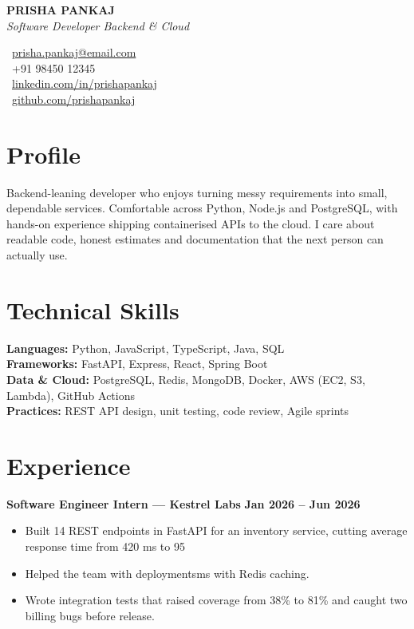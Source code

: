 \documentclass[a4paper,10pt]{article}
\newcommand{\resumeItemListStart}{\begin{itemize}[leftmargin=1.15em, itemsep=3pt, topsep=3pt, partopsep=0pt, parsep=0pt]}
\newcommand{\resumeItemListEnd}{\end{itemize}\vspace{5pt}}
\newcommand{\resumeEntryTitle}[2]{\textbf{#1} \hfill \textbf{#2} \\[-9pt]}
\begin{document}
\noindent
\begin{minipage}[t]{0.60\textwidth}
  \raggedright
  {\fontsize{24}{26}\selectfont \bfseries PRISHA PANKAJ} \\[3pt]
  \textit{Software Developer \textbar{} Backend \& Cloud}
\end{minipage}%
\begin{minipage}[t]{0.40\textwidth}
  \raggedleft
  \vspace{-17pt}
  \small
  \faEnvelope \ \href{mailto:prisha.pankaj@email.com}{prisha.pankaj@email.com} \\[3pt]
  \faPhone \ +91 98450 12345 \\[3pt]
  \faLinkedin \ \href{https://linkedin.com/in/prishapankaj}{linkedin.com/in/prishapankaj} \\[3pt]
  \faGithub \ \href{https://github.com/prishapankaj}{github.com/prishapankaj} \\[3pt]
\end{minipage}
\vspace{2pt}

\section*{Profile}
Backend-leaning developer who enjoys turning messy requirements into small, dependable services. Comfortable across Python, Node.js and PostgreSQL, with hands-on experience shipping containerised APIs to the cloud. I care about readable code, honest estimates and documentation that the next person can actually use.


\section*{Technical Skills}
\textbf{Languages:} Python, JavaScript, TypeScript, Java, SQL \\
\textbf{Frameworks:} FastAPI, Express, React, Spring Boot \\
\textbf{Data \& Cloud:} PostgreSQL, Redis, MongoDB, Docker, AWS (EC2, S3, Lambda), GitHub Actions \\
\textbf{Practices:} REST API design, unit testing, code review, Agile sprints


\section*{Experience}
\resumeEntryTitle{Software Engineer Intern — Kestrel Labs}{Jan 2026 – Jun 2026}
\resumeItemListStart
  \item Built 14 REST endpoints in FastAPI for an inventory service, cutting average response time from 420 ms to 95
  \item Helped the team with deploymentsms with Redis caching.
  \item Wrote integration tests that raised coverage from 38\% to 81\% and caught two billing bugs before release.
\resumeItemListEnd
\end{document}
